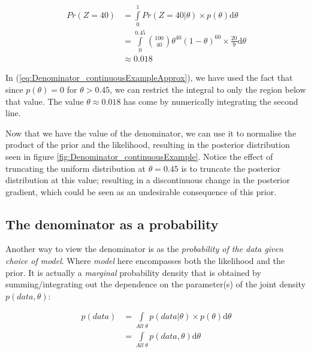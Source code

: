 \documentclass[11pt,fullpage]{book}
\begin{document}
\begin{equation}\label{eq:Denominator_continuousExampleApprox}
\begin{align}
Pr(Z=40) &= \int\limits_{0}^{1} Pr(Z=40|\theta) \times p(\theta) \mathrm{d}\theta\\
&= \int\limits_{0}^{0.45} {100 \choose 40} \theta^{40} (1-\theta)^{60} \times \frac{20}{9} \mathrm{d}\theta\\
&\approx 0.018
\end{align}
\end{equation}

In (\ref{eq:Denominator_continuousExampleApprox}), we have used the fact that since $p(\theta)=0$ for $\theta>0.45$, we can restrict the integral to only the region below that value. The value $\theta\approx 0.018$ has come by numerically integrating the second line.

Now that we have the value of the denominator, we can use it to normalise the product of the prior and the likelihood, resulting in the posterior distribution seen in figure \ref{fig:Denominator_continuousExample}. Notice the effect of truncating the uniform distribution at $\theta=0.45$ is to truncate the posterior distribution at this value; resulting in a discontinuous change in the posterior gradient, which could be seen as an undesirable consequence of this prior.

\subsection{The denominator as a probability}\label{sec:Denominator_asAProbability}
Another way to view the denominator is as the \textit{probability of the data given choice of model}. Where \textit{model} here encompasses both the likelihood and the prior. It is actually a \textit{marginal} probability density that is obtained by summing/integrating out the dependence on the parameter(s) of the joint density $p(data,\theta)$:

\begin{equation}\label{eq:Denominator_jointDensity}
\begin{align}
p(data) &= \int\limits_{All\; \theta} p(data|\theta) \times p(\theta)\mathrm{d}\theta\\
& = \int\limits_{All\; \theta} p(data,\theta) \mathrm{d}\theta
\end{align}
\end{equation}
\end{document}
